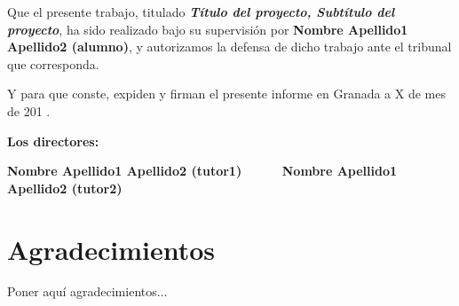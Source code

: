 \vspace{0.5cm}

Que el presente trabajo, titulado \textit{\textbf{Título del proyecto, Subtítulo del proyecto}},
ha sido realizado bajo su supervisión por \textbf{Nombre Apellido1 Apellido2 (alumno)}, y autorizamos la defensa de dicho trabajo ante el tribunal
que corresponda.

\vspace{0.5cm}

Y para que conste, expiden y firman el presente informe en Granada a X de mes de 201 .

\vspace{1cm}

\textbf{Los directores:}

\vspace{5cm}

\noindent \textbf{Nombre Apellido1 Apellido2 (tutor1) \ \ \ \ \ Nombre Apellido1 Apellido2 (tutor2)}

\chapter*{Agradecimientos}
\thispagestyle{empty}

       \vspace{1cm}


Poner aquí agradecimientos...

